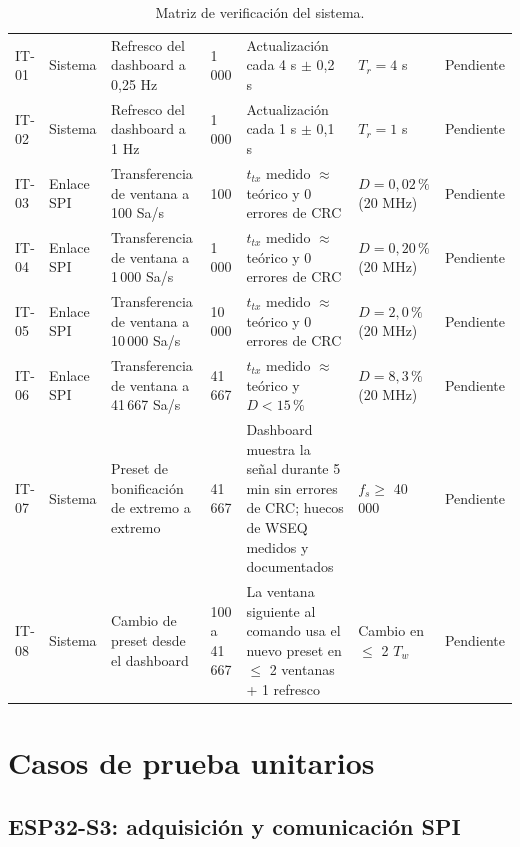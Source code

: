 \documentclass[12pt,a4paper]{article}
\begin{document}
\begin{table}[H]
\begin{tabular}{@{}p{1.3cm} p{1.7cm} p{3.3cm} p{1.7cm} p{3.0cm} p{2.5cm} p{1.4cm}@{}}
IT-01 & Sistema & Refresco del dashboard a 0{,}25 Hz & 1\,000 & Actualización cada 4 s $\pm$ 0{,}2 s & $T_r = 4$ s & Pendiente \\
IT-02 & Sistema & Refresco del dashboard a 1 Hz & 1\,000 & Actualización cada 1 s $\pm$ 0{,}1 s & $T_r = 1$ s & Pendiente \\
IT-03 & Enlace SPI & Transferencia de ventana a 100 Sa/s & 100 & $t_{tx}$ medido $\approx$ teórico y 0 errores de CRC & $D = 0{,}02\,\%$ (20 MHz) & Pendiente \\
IT-04 & Enlace SPI & Transferencia de ventana a 1\,000 Sa/s & 1\,000 & $t_{tx}$ medido $\approx$ teórico y 0 errores de CRC & $D = 0{,}20\,\%$ (20 MHz) & Pendiente \\
IT-05 & Enlace SPI & Transferencia de ventana a 10\,000 Sa/s & 10\,000 & $t_{tx}$ medido $\approx$ teórico y 0 errores de CRC & $D = 2{,}0\,\%$ (20 MHz) & Pendiente \\
IT-06 & Enlace SPI & Transferencia de ventana a 41\,667 Sa/s & 41\,667 & $t_{tx}$ medido $\approx$ teórico y $D < 15\,\%$ & $D = 8{,}3\,\%$ (20 MHz) & Pendiente \\
IT-07 & Sistema & Preset de bonificación de extremo a extremo & 41\,667 & Dashboard muestra la señal durante 5 min sin errores de CRC; huecos de WSEQ medidos y documentados & $f_s \geq$ 40\,000 & Pendiente \\
IT-08 & Sistema & Cambio de preset desde el dashboard & 100 a 41\,667 & La ventana siguiente al comando usa el nuevo preset en $\leq$ 2 ventanas + 1 refresco & Cambio en $\leq$ 2 $T_w$ & Pendiente \\
\bottomrule
\end{tabular}
\caption{Matriz de verificación del sistema.}
\label{tab:matriz}
\end{table}

\section{Casos de prueba unitarios}

\subsection{ESP32-S3: adquisición y comunicación SPI}
\end{document}
